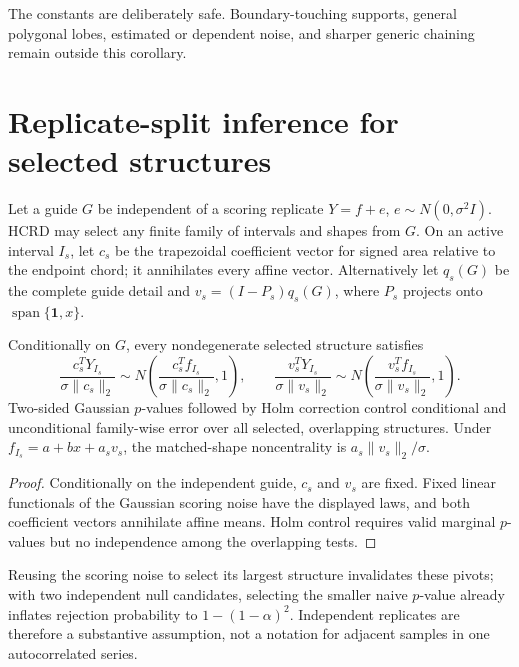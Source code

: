 The constants are deliberately safe.  Boundary-touching supports, general
polygonal lobes, estimated or dependent noise, and sharper generic chaining
remain outside this corollary.

\section{Replicate-split inference for selected structures}
Let a guide $G$ be independent of a scoring replicate
$Y=f+e$, $e\sim N(0,\sigma^2I)$.  HCRD may select any finite family of
intervals and shapes from $G$.  On an active interval $I_s$, let $c_s$ be the
trapezoidal coefficient vector for signed area relative to the endpoint chord;
it annihilates every affine vector.  Alternatively let $q_s(G)$ be the complete
guide detail and $v_s=(I-P_s)q_s(G)$, where $P_s$ projects onto
$\operatorname{span}\{\mathbf 1,x\}$.

\begin{theorem}
\label{thm:replicate}
Conditionally on $G$, every nondegenerate selected structure satisfies
\begin{equation}
 \frac{c_s^T Y_{I_s}}{\sigma\|c_s\|_2}
 \sim N\!\left(\frac{c_s^Tf_{I_s}}{\sigma\|c_s\|_2},1\right),\qquad
 \frac{v_s^T Y_{I_s}}{\sigma\|v_s\|_2}
 \sim N\!\left(\frac{v_s^Tf_{I_s}}{\sigma\|v_s\|_2},1\right).
\end{equation}
Two-sided Gaussian $p$-values followed by Holm correction control conditional
and unconditional family-wise error over all selected, overlapping structures.
Under $f_{I_s}=a+bx+a_s v_s$, the matched-shape noncentrality is
$a_s\|v_s\|_2/\sigma$.
\end{theorem}
\begin{proof}
Conditionally on the independent guide, $c_s$ and $v_s$ are fixed.  Fixed
linear functionals of the Gaussian scoring noise have the displayed laws, and
both coefficient vectors annihilate affine means.  Holm control requires valid
marginal $p$-values but no independence among the overlapping tests.
\end{proof}

Reusing the scoring noise to select its largest structure invalidates these
pivots; with two independent null candidates, selecting the smaller naive
$p$-value already inflates rejection probability to $1-(1-\alpha)^2$.
Independent replicates are therefore a substantive assumption, not a notation
for adjacent samples in one autocorrelated series.

